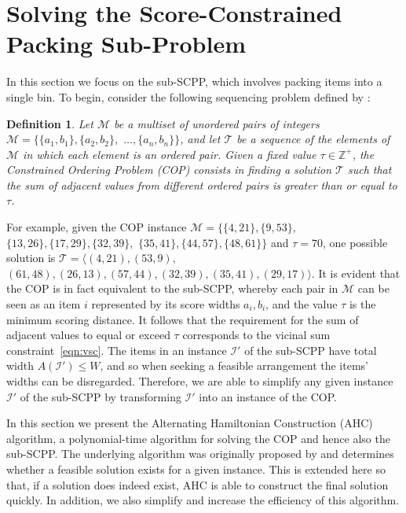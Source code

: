\documentclass[a4paper,11pt,authoryear]{elsarticle}
\newtheorem{definition}{Definition}
\begin{document}
\section{Solving the Score-Constrained Packing Sub-Problem}
\label{sec:ahc}

\noindent In this section we focus on the sub-SCPP, which involves packing items into a single bin. To begin, consider the following sequencing problem defined by \cite{hawa2018}:

\begin{definition} %
	Let $\mathcal{M}$ be a multiset of unordered pairs of integers $\mathcal{M} = \{\{a_1, b_1\}, \{a_2, b_2\},$ $\dotsc,\{a_n, b_n\}\}$, and let $\mathcal{T}$ be a sequence of the elements of $\mathcal{M}$ in which each element is an ordered pair. Given a fixed value $\tau \in \mathbb{Z}^+$, the \emph{Constrained Ordering Problem (COP)} consists in finding a solution $\mathcal{T}$ such that the sum of adjacent values from different ordered pairs is greater than or equal to $\tau$.
	\label{defn:cop}
\end{definition}

\noindent For example, given the COP instance $\mathcal{M} = \{\{4,21\}, \{9,53\},$ $\{13,26\}, \{17,29\}, \{32,39\},$ $\{35,41\}, \{44,57\}, \{48,61\} \}$ and $\tau = 70$, one possible solution is $\mathcal{T} = \langle(4,21), (53,9),$ $(61,48), (26,13), (57,44), (32,39), (35,41), (29,17)\rangle$. It is evident that the COP is in fact equivalent to the sub-SCPP, whereby each pair in $\mathcal{M}$ can be seen as an item $i$ represented by its score widths $a_i, b_i$, and the value $\tau$ is the minimum scoring distance. It follows that the requirement for the sum of adjacent values to equal or exceed $\tau$ corresponds to the vicinal sum constraint~\eqref{eqn:vsc}. The items in an instance $\mathcal{I}'$ of the sub-SCPP have total width $A(\mathcal{I}') \leq W$, and so when seeking a feasible arrangement the items' widths can be disregarded. Therefore, we are able to simplify any given instance $\mathcal{I}'$ of the sub-SCPP by transforming $\mathcal{I}'$ into an instance of the COP.

In this section we present the Alternating Hamiltonian Construction (AHC) algorithm, a polynomial-time algorithm for solving the COP and hence also the sub-SCPP. The underlying algorithm was originally proposed by \cite{becker2010} and determines whether a feasible solution exists for a given instance. This is extended here so that, if a solution does indeed exist, AHC is able to construct the final solution quickly. In addition, we also simplify and increase the efficiency of this algorithm.
\end{document}
